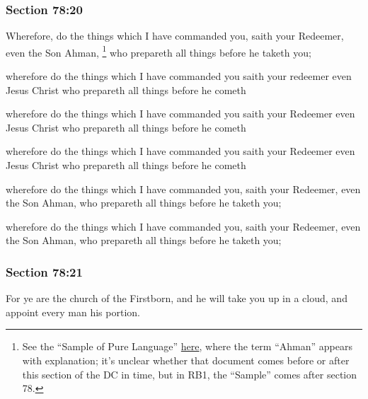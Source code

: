 	\subsubsection{Section 78:20} %
		\label{DC78-20}

		Wherefore, do the things which I have commanded you, saith your Redeemer, even the Son Ahman,%
			\footnote{%
				See the ``Sample of Pure Language'' \hyperref[EMS-1832-JS-CIR-4-MAR-1832-LANG]{here}, where the term ``Ahman'' appears with explanation; it's unclear whether that document comes before or after this section of the DC in time, but in RB1, the ``Sample'' comes after section 78.
				}
		who prepareth all things before he taketh you;

		\begin{framed}
		\scriptsize
			\begin{compactdesc}
				\item[JSP] wherefore do the things which I have commanded you saith your redeemer even Jesus Christ who prepareth all things before he cometh
				\item[RB1] wherefore do the things which I have commanded you saith your Redeemer even Jesus Christ who prepareth all things before he cometh
				\item[RB2] wherefore do the things which I have commanded you saith your Redeemer even Jesus Christ who prepareth all things before he cometh
				\item[DC 1835] wherefore do the things which I have commanded you, saith your Redeemer, even the Son Ahman, who prepareth all things before he taketh you;
				\item[DC 1844] wherefore do the things which I have commanded you, saith your Redeemer, even the Son Ahman, who prepareth all things before he taketh you;
			\end{compactdesc}
		\end{framed}

	\subsubsection{Section 78:21} %
		\label{DC78-21}

		For ye are the church of the Firstborn, and he will take you up in a cloud, and appoint every man his portion.

